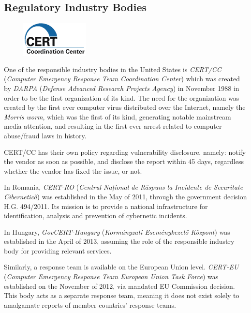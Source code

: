 \documentclass[a4paper,12pt]{article}
\begin{document}
\subsection{Regulatory Industry Bodies}
	
	\begin{figure}
		\vspace{-11pt}
		\centering
		\includegraphics[scale=0.70]{cert.png}
	\end{figure}
	
	One of the responsible industry bodies in the United States is \textit{CERT/CC} (\textit{Computer Emergency Response Team Coordination Center}) which was created by \textit{DARPA} (\textit{Defense Advanced Research Projects Agency}) in November 1988 in order to be the first organization of its kind. The need for the organization was created by the first ever computer virus distributed over the Internet, namely the \textit{Morris worm}\cite{cert15}, which was the first of its kind, generating notable mainstream media attention, and resulting in the first ever arrest related to computer abuse/fraud laws in history.
	
	CERT/CC has their own policy regarding vulnerability disclosure, namely: notify the vendor as soon as possible, and disclose the report within 45 days, regardless whether the vendor has fixed the issue, or not.
	
	In Romania, \textit{CERT-RO} (\textit{Centrul Național de Răspuns la Incidente de Securitate Cibernetică}) was established in the May of 2011, through the government decision H.G. 494/2011\cite{certro12}. Its mission is to provide a national infrastructure for identification, analysis and prevention of cybernetic incidents.
	
	In Hungary, \textit{GovCERT-Hungary} (\textit{Kormányzati Eseménykezelő Központ}) was established in the April of 2013\cite{certhu13}, assuming the role of the responsible industry body for providing relevant services.
	
	Similarly, a response team is available on the European Union level. \textit{CERT-EU} (\textit{Computer Emergency Response Team European Union Task Force}) was established on the November of 2012\cite{certeu13}, via mandated EU Commission decision. This body acts as a separate response team, meaning it does not exist solely to amalgamate reports of member countries' response teams.
	
\end{document}
